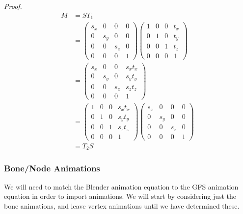 \documentclass{article}
\begin{document}
\noindent\textit{Proof.}
\begin{align}
M &= ST_1 \\
&=
\begin{pmatrix}
s_x & 0 & 0 & 0\\
0 & s_y & 0 & 0\\
0 & 0 & s_z & 0\\
0 & 0 & 0 & 1
\end{pmatrix}
\begin{pmatrix}
1 & 0 & 0 & t_x\\
0 & 1 & 0 & t_y\\
0 & 0 & 1 & t_z\\
0 & 0 & 0 & 1
\end{pmatrix}\\
&=
\begin{pmatrix}
s_x & 0 & 0 & s_x t_x\\
0 & s_y & 0 & s_y t_y\\
0 & 0 & s_z & s_z t_z\\
0 & 0 & 0 & 1
\end{pmatrix}\\
&=
\begin{pmatrix}
1 & 0 & 0 & s_x t_x\\
0 & 1 & 0 & s_y t_y\\
0 & 0 & 1 & s_z t_z\\
0 & 0 & 0 & 1
\end{pmatrix}
\begin{pmatrix}
s_x & 0 & 0 & 0\\
0 & s_y & 0 & 0\\
0 & 0 & s_z & 0\\
0 & 0 & 0 & 1
\end{pmatrix}\\
&= T_2 S
\end{align}

\clearpage

\subsubsection{Bone/Node Animations}
We will need to match the Blender animation equation to the GFS animation equation in order to import animations. We will start by considering just the bone animations, and leave vertex animations until we have determined these.
\end{document}
